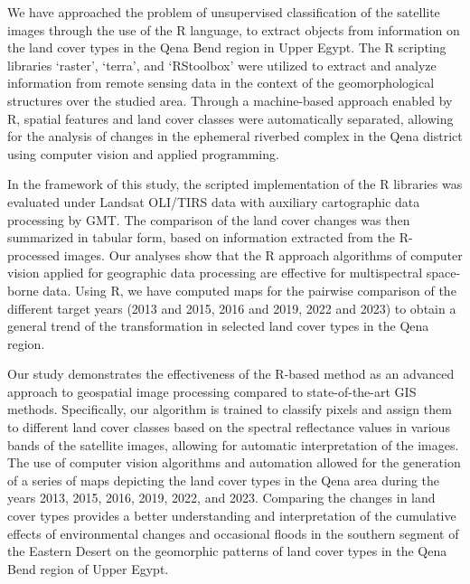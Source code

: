 \documentclass[information,article,accept,pdftex,moreauthors]{Definitions/mdpi}
\begin{document}
We have approached the problem of unsupervised classification of the satellite images {through the use of the R language, to extract objects from }information on the land cover types {in the }Qena Bend region {in }Upper Egypt. {The R scripting }libraries `raster', `terra'{, }and `RStoolbox' {were utilized to extract and analyze information from }remote sensing data {in the context of the geomorphological structures over the studied area. Through a machine-based approach enabled by R, spatial features and land cover classes were automatically separated, allowing for the analysis of changes in the ephemeral riverbed complex in the Qena district using }computer vision and applied programming.

In the framework of this study, the {scripted }implementation of the R libraries {was }evaluated under Landsat OLI/TIRS data with auxiliary cartographic data processing by GMT. The comparison of the land cover changes {was then summarized in tabular form, based on }information extracted from the R-processed images. Our analyses show that {the R approach }algorithms of computer vision applied for geographic data processing are effective for multispectral {space-borne data. Using R, we have computed maps for the pairwise comparison of the different target years (2013 and 2015, 2016 and 2019, 2022 and 2023) to obtain a general trend of the transformation in selected land cover types in the Qena region.}

Our study demonstrates the effectiveness of the R-based method {as }an advanced approach to geospatial image processing compared to state-of-the-art GIS methods. {Specifically, our algorithm is }trained to classify pixels and assign them to {different }land cover classes {based on the spectral reflectance values }in various bands of the satellite images{, allowing for automatic interpretation of the images. The use of }computer vision algorithms {and automation allowed for the generation of } a series of {maps depicting }the land cover types in {the Qena area during the years }2013, 2015, 2016, 2019, 2022{, }and 2023. {Comparing the }changes in land cover types {provides a better understanding and interpretation of }the cumulative effects {of } environmental changes and occasional floods in {the }southern segment of the Eastern Desert on the geomorphic patterns {of } land cover types {in the Qena Bend region of Upper Egypt}.

\end{document}
